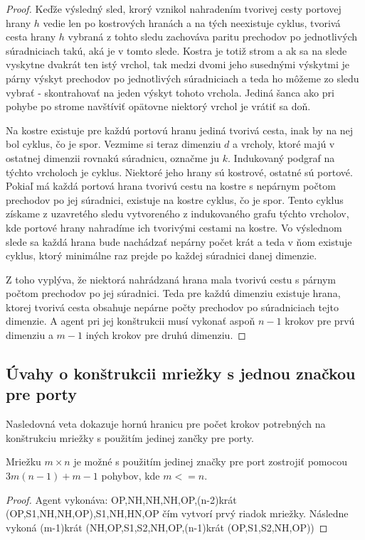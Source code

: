 \begin{proof}
Keďže výsledný sled, krorý vznikol nahradením tvorivej cesty portovej hrany
$h$ vedie len po kostrových hranách a na tých neexistuje cyklus, tvorivá
cesta hrany $h$ vybraná z tohto sledu zachováva paritu prechodov po
jednotlivých súradniciach takú, aká je v tomto slede.
Kostra je totiž strom a ak sa na slede vyskytne dvakrát ten istý vrchol, tak
medzi dvomi jeho susednými výskytmi je párny výskyt prechodov po
jednotlivých súradniciach a teda ho môžeme zo sledu vybrať - skontrahovať na
jeden výskyt tohoto vrchola. Jediná šanca ako pri pohybe po strome navštíviť
opätovne niektorý vrchol je vrátiť sa doň.

Na kostre existuje pre každú portovú hranu jediná tvorivá cesta, inak by na
nej bol cyklus, čo je spor.
Vezmime si teraz dimenziu $d$ a vrcholy, ktoré majú v ostatnej dimenzii
rovnakú súradnicu, označme ju $k$. Indukovaný podgraf na týchto vrcholoch je
cyklus. Niektoré jeho hrany sú kostrové, ostatné sú portové. Pokiaľ má každá
portová hrana tvorivú cestu na kostre s nepárnym počtom prechodov po jej
súradnici, existuje na kostre cyklus, čo je spor.
Tento cyklus získame z uzavretého sledu vytvoreného z indukovaného grafu
týchto vrcholov, kde portové hrany nahradíme ich tvorivými cestami na
kostre. Vo výslednom slede sa každá hrana bude nachádzať nepárny počet krát
a teda v ňom existuje cyklus, ktorý minimálne raz prejde po každej súradnici
danej dimenzie.

Z toho vyplýva, že niektorá nahrádzaná hrana mala tvorivú cestu s párnym
počtom prechodov po jej súradnici.
Teda pre každú dimenziu existuje hrana, ktorej tvorivá cesta obsahuje
nepárne počty prechodov po súradniciach tejto dimenzie. A agent pri jej
konštrukcii musí vykonať aspoň $n - 1$ krokov pre prvú dimenziu a $m - 1$
iných  krokov pre druhú dimenziu.
\end{proof}

\subsection{Úvahy o konštrukcii mriežky s jednou značkou pre porty}
Nasledovná veta dokazuje hornú hranicu pre počet krokov potrebných na
konštrukciu mriežky s použitím jedinej zančky pre porty.

\begin{veta}
Mriežku $m \times n$ je možné s použitím jedinej značky pre port zostrojiť
pomocou $3m(n - 1) + m - 1$ pohybov, kde $m <= n$.
\end{veta}
\begin{proof}
Agent vykonáva: OP,NH,NH,NH,OP,(n-2)krát (OP,S1,NH,NH,OP),S1,NH,HN,OP čím
vytvorí prvý riadok mriežky. Následne vykoná
(m-1)krát (NH,OP,S1,S2,NH,OP,(n-1)krát (OP,S1,S2,NH,OP))
\end{proof}



